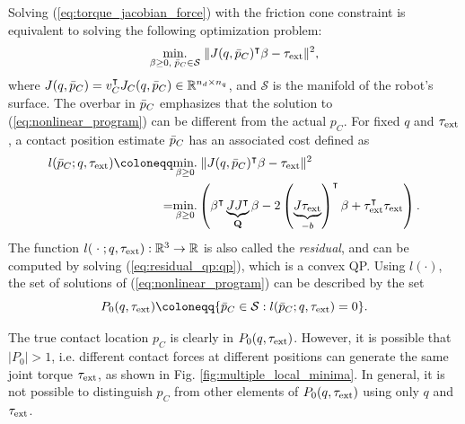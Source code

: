 Solving (\ref{eq:torque_jacobian_force}) with the friction cone constraint is equivalent to solving the following optimization problem:
\begin{equation}
\label{eq:nonlinear_program}
\underset{{\beta} \geq 0, \; \bar{p}_C \in \mathcal{S}}{\text{min.}} \; \| {J}({q}, \bar{p}_C)^{\intercal} {\beta} - {\tau}_\text{ext} \|^2,
\end{equation}
where ${J}({q}, \bar{p}_C) = {v}_C^\intercal {J}_C({q}, \bar{p}_C) \in \mathbb{R}^{n_d \times n_q}$, and $\mathcal{S}$ is the manifold of the robot's surface. The overbar in $\bar{p}_C$ emphasizes that the solution to (\ref{eq:nonlinear_program}) can be different from the actual ${p}_C$. For fixed ${q}$ and $\tau_{\text{ext}}$, a contact position estimate $\bar{p}_C$ has an associated cost defined as
\begin{subequations}
\label{eq:residual_qp}
\begin{align}
l(\pCbar; {q}, \tauE) \coloneqq& \underset{{\beta} \geq 0}{\text{min.}} \; \| {J}({q}, \pCbar)^{\intercal} {\beta} - {\tau}_\text{ext} \|^2 \\
=& \underset{{\beta} \geq 0}{\text{min.}} \left({\beta}^\intercal \underbrace{{J}{J}^\intercal}_{\mathbf{Q}} {\beta} - 2 \left(\underbrace{{J} \tauE}_{-{b}}\right)^\intercal {\beta} + \tauE^\intercal \tauE \right). \label{eq:residual_qp:qp}
\end{align}
\end{subequations}
The function $l(\; \cdot \;; {q}, \tau_{\text{ext}}): \mathbb{R}^3 \rightarrow \mathbb{R}$ is also called the \textit{residual}, and can be computed by solving (\ref{eq:residual_qp:qp}), which is a convex QP. Using $l(\cdot)$, the set of solutions of (\ref{eq:nonlinear_program}) can be described by the set
\begin{equation}
P_0(q, \tauE) \coloneqq \{\pCbar \in \mathcal{S} : l(\pCbar; q, \tauE) = 0\}.
\end{equation}

The true contact location ${p}_C$ is clearly in $P_0(q, \tau_{\text{ext}})$. However, it is possible that $|P_0| > 1$, i.e. different contact forces at different positions can generate the same joint torque $\tau_{\text{ext}}$, as shown in Fig. \ref{fig:multiple_local_minima}. In general, it is not possible to distinguish ${p}_C$ from other elements of $P_0(q, \tau_{\text{ext}})$ using only $q$ and $\tau_{\text{ext}}$.

